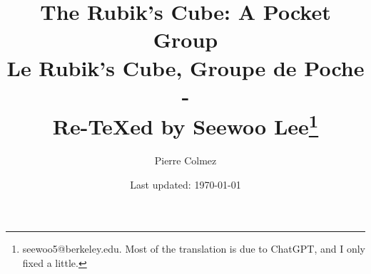 \documentclass[letterpaper, 10pt]{article}
\begin{document}

\title{The Rubik's Cube: A Pocket Group \\[1em]
\normalsize Le Rubik's Cube, Groupe de Poche\\ - \\
\normalsize Re-\TeX ed by Seewoo Lee\footnote{seewoo5@berkeley.edu. Most of the translation is due to ChatGPT, and I only fixed a little.}}


\author{Pierre Colmez}
\date{\normalsize\vspace{-1ex} Last updated: \today}


\maketitle









\newpage










\end{document}
